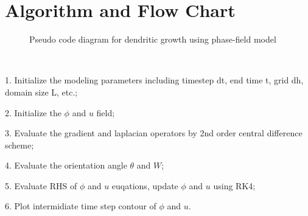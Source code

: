 \documentclass{article}
\begin{document}
\section{Algorithm and Flow Chart}
\begin{figure}[htb!]
\begin{center}
\caption{Pseudo code diagram for dendritic growth using phase-field model}
\end{center}
\end{figure}
\par \ 
\par 1. Initialize the modeling parameters including timestep dt, end time t, grid dh, domain size L, etc.;
\par 2. Initialize the $\phi$ and $u$ field;
\par 3. Evaluate the gradient and laplacian operators by 2nd order central difference scheme; 
\par 4. Evaluate the orientation angle $\theta$ and $W$;
\par 5. Evaluate RHS of $\phi$ and $u$ euqations, update $\phi$ and $u$ using RK4;
\par 6. Plot intermidiate time step contour of $\phi$ and $u$.
\end{document}
